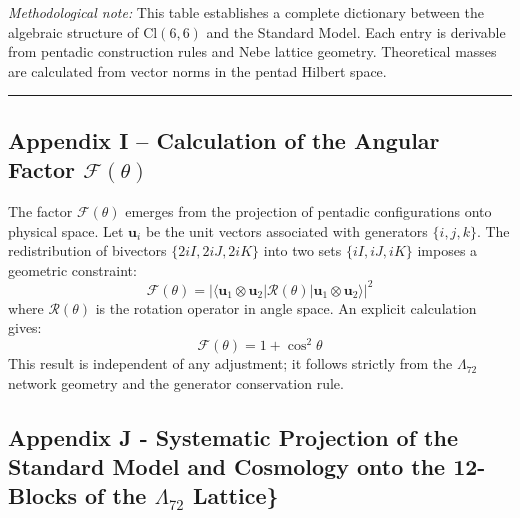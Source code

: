 \documentclass[11pt]{article}
\let\oldmathcal\mathcal
\renewcommand{\mathcal}[1]{\oldmathcal{#1}}
\begin{document}
\emph{Methodological note:} This table establishes a complete dictionary
between the algebraic structure of \(\text{Cl}(6,6)\) and the Standard
Model. Each entry is derivable from pentadic construction rules and Nebe
lattice geometry. Theoretical masses are calculated from vector norms in
the pentad Hilbert space.

\begin{center}\rule{0.5\linewidth}{0.5pt}\end{center}

\hypertarget{appendix-i-calculation-of-the-angular-factor-mathcalftheta}{%
\subsection{\texorpdfstring{Appendix I -- Calculation of the Angular
Factor
\(\mathcal{F}(\theta)\)}{Appendix I -- Calculation of the Angular Factor \textbackslash mathcal\{F\}(\textbackslash theta)}}\label{appendix-i-calculation-of-the-angular-factor-mathcalftheta}}

The factor \(\mathcal{F}(\theta)\) emerges from the projection of
pentadic configurations onto physical space. Let \(\mathbf{u}_i\) be the
unit vectors associated with generators \(\{i,j,k\}\). The
redistribution of bivectors \(\{2iI, 2iJ, 2iK\}\) into two sets
\(\{iI, iJ, iK\}\) imposes a geometric constraint: \[
\mathcal{F}(\theta) = \left| \langle \mathbf{u}_1 \otimes \mathbf{u}_2 | \mathcal{R}(\theta) | \mathbf{u}_1 \otimes \mathbf{u}_2 \rangle \right|^2
\] where \(\mathcal{R}(\theta)\) is the rotation operator in angle
space. An explicit calculation gives: \[
\mathcal{F}(\theta) = 1 + \cos^2\theta
\] This result is independent of any adjustment; it follows strictly
from the \(\Lambda_{72}\) network geometry and the generator
conservation rule.

\clearpage

\hypertarget{appendix-j---systematic-projection-of-the-standard-model-and-cosmology-onto-the-12-blocks-of-the-lambda_72-lattice}{%
\subsection{\texorpdfstring{Appendix J - Systematic Projection of the
Standard Model and Cosmology onto the 12-Blocks of the \(\Lambda_{72}\)
Lattice\}}{Appendix J - Systematic Projection of the Standard Model and Cosmology onto the 12-Blocks of the \textbackslash Lambda\_\{72\} Lattice\}}}\label{appendix-j---systematic-projection-of-the-standard-model-and-cosmology-onto-the-12-blocks-of-the-lambda_72-lattice}}
\end{document}
